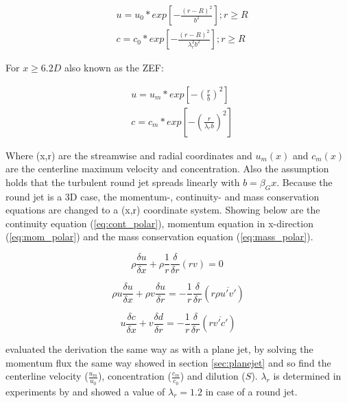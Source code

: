 \begin{equation}
    \begin{split}
        & u = u_0 * exp [ - \frac{(r-R)^2}{b^2}] ; r \geq R \\
        & c = c_0 * exp [ - \frac{(r-R)^2}{\lambda_r^2 b^2}] ; r \geq R
    \end{split}
\end{equation}

\noindent For $x \geq 6.2D$ also known as the ZEF:

\begin{equation}
    \begin{split}
        & u = u_m * exp [ - (\frac{r}{b})^2] \\
        & c = c_m * exp [ - (\frac{r}{\lambda_r b})^2]
    \end{split}
\end{equation}

\noindent Where (x,r) are the streamwise and radial coordinates and $u_m(x)$ and $c_m(x)$ are the centerline maximum velocity and concentration. Also the assumption holds that the turbulent round jet spreads linearly with $b = \beta_G x$. Because the round jet is a 3D case, the momentum-, continuity- and mass conservation equations are changed to a (x,r) coordinate system. Showing below are the continuity equation (\ref{eq:cont_polar}), momentum equation in x-direction (\ref{eq:mom_polar}) and the mass conservation equation (\ref{eq:mass_polar}).

\begin{equation}
    \rho \frac{\delta u}{\delta x} + \rho \frac{1}{r}\frac{\delta}{\delta r} (rv) = 0\
    \label{eq:cont_polar}
\end{equation}

\begin{equation}
    \rho u \frac{\delta u}{\delta x} + \rho v \frac{\delta u}{\delta r} = - \frac{1}{r}\frac{\delta}{\delta r}(r\rho \overline{u'v'})
    \label{eq:mom_polar}
\end{equation}


\begin{equation}
    u \frac{\delta c}{\delta x} + v \frac{\delta d}{\delta r} = - \frac{1}{r}\frac{\delta}{\delta r} (r\overline{v'c'})
    \label{eq:mass_polar}
\end{equation} \newline

\noindent \cite{Lee+} evaluated the derivation the same way as with a plane jet, by solving the momentum flux the same way showed in section \ref{sec:planejet} and so find the centerline velocity ($\frac{u_m}{u_0}$), concentration ($\frac{c_m}{c_0}$) and dilution ($S$). $\lambda_r$ is determined in experiments by \cite{Papanicolaou+} and showed a value of $\lambda_r = 1.2$ in case of a round jet.

